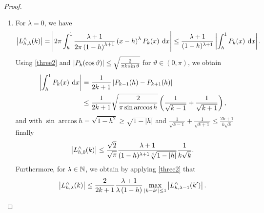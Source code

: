 \begin{proof}${}^{}$\\[-3.5ex]
  \begin{enumerate}
  \item For $\lambda=0$, we have
    \begin{equation*}
      \left|L_{h,\lambda}^{\wedge}{\hspace{-0.4ex}}\left(k\right)\right| 
      = \left\vert2\pi \int_{h}^1 \frac{\lambda+1}{2\pi\left(1-h\right)^{\lambda+1}} 
        \left(x-h\right)^{\lambda} P_{k}{\hspace{-0.4ex}}\left(x\right) \: \text{\rm{d}} x\right\vert 
      \le \frac{\lambda+1}{(1-h)^{\lambda+1}}\left\vert\int_{h}^1 P_{k}{\hspace{-0.4ex}}\left(x\right) \: \text{\rm{d}} x\right\vert.
    \end{equation*}
    Using \eqref{three2} and $\left|P_{k}{\hspace{-0.4ex}}\left(\cos\vartheta\right)\right|
    \le \sqrt{\frac{2}{\pi k \sin\vartheta}}$ for $\vartheta \in (0,\pi)$, we obtain
    \begin{align*}
      \left\vert\int_{h}^1 P_{k}{\hspace{-0.4ex}}\left(x\right) \: \text{\rm{d}} x\right\vert
      & = \frac{1}{2k+1}
          \left\vert P_{k-1}{\hspace{-0.4ex}}\left(h\right) - P_{k+1}{\hspace{-0.4ex}}\left(h\right)\right\vert\\
      & \le \frac{1}{2k+1} \sqrt{\frac{2}{\pi \sin\arccos h}} \left(\frac{1}{\sqrt{k-1}} + \frac{1}{\sqrt{k+1}}\right),
    \end{align*}
    and with $\sin\arccos h = \sqrt{1-h^2} \ge \sqrt{1-|h|}$ and
    $\frac{1}{\sqrt{k-1}} + \frac{1}{\sqrt{k+1}} \le
    \frac{2k+1}{k\sqrt{k}}$ finally
    \begin{equation}
      \label{SmallLambda}
      \left|L_{h,0}^{\wedge}{\hspace{-0.4ex}}\left(k\right)\right| \le 
      \frac{\sqrt{2}}{\sqrt{\pi}}\frac{\lambda+1}{(1-h)^{\lambda+1}\sqrt[4]{1-|h|}}
      \frac{1}{k\sqrt{k}}.
    \end{equation}
    Furthermore, for $\lambda \in \mathbb{N}$, we obtain by applying \eqref{three2} that
    \begin{equation*}
      \left|L_{h,\lambda}^{\wedge}{\hspace{-0.4ex}}\left(k\right)\right| 
      \le \frac{2}{2k+1} \frac{\lambda+1}{\lambda\left(1-h\right)}
      \max\limits_{|k-k'|\le 1}
      \left|L_{h,\lambda-1}^{\wedge}{\hspace{-0.4ex}}\left(k'\right)\right|.
    \end{equation*}

\end{enumerate}
\end{proof}
